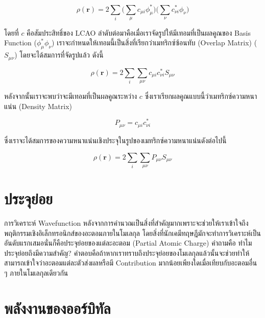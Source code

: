 \begin{equation}
    \rho (\mathbf{r}) = 2 \sum_{i} \big( \sum_{\mu} c_{\mu i} \phi_{\mu}^{*} \big) 
    \big( \sum_{\nu} c^{*}_{\nu i}  \phi_{\nu} \big)
\end{equation}

\noindent โดยที่ $c$ คือสัมประสิทธิ์ของ LCAO ลำดับต่อมาคือเมื่อเราจัดรูปให้มีเทอมที่เป็นผลคูณของ Basis Function ($\phi_{\mu}^{*} 
\phi_{\nu}$) เราจะกำหนดให้เทอมนี้เป็นสิ่งที่เรียกว่าเมทริกซ์ซ้อนทับ (Overlap Matrix) ($S_{\mu\nu}$) โดยจะได้สมการที่จัดรูปแล้ว ดังนี้

\begin{equation}
    \rho (\mathbf{r}) = 2 \sum_{i}\sum_{\mu\nu} c_{\mu i} c^{*}_{\nu i} S_{\mu\nu}
\end{equation}

หลังจากนั้นเราจะพบว่าจะมีเทอมที่เป็นผลคูณระหว่าง $c$ ซึ่งเราเรียกผลคูณแบบนี้ว่าเมทริกซ์ความหนาแน่น (Density Matrix) 

\begin{equation}\label{eq:density_matrix}
    P_{\mu\nu} = c_{\mu i} c^{*}_{\nu i}
\end{equation}

\noindent ซึ่งเราจะได้สมการของความหนาแน่นเชิงประจุในรูปของเมทริกซ์ความหนาแน่นดังต่อไปนี้

\begin{equation}\label{eq:charge_density_matrix}
    \rho (\mathbf{r}) = 2 \sum_{i} \sum_{\mu\nu} P_{\mu\nu}S_{\mu\nu}
\end{equation}

\section{ประจุย่อย}
\label{sec:partial_charge}

การวิเคราะห์ Wavefunction หลังจากการคำนวณเป็นสิ่งที่สำคัญมากเพราะจะช่วยให้เราเข้าใจถึงพฤติกรรมเชิงอิเล็กทรอนิกส์ของอะตอมภายในโมเลกุล 
โดยสิ่งที่นักเคมีทฤษฎีมักจะทำการวิเคราะห์เป็นอันดับแรกเสมอนั่นก็คือประจุย่อยของแต่ละอะตอม (Partial Atomic Charge) คำถามคือ 
ทำไมประจุย่อยถึงมีความสำคัญ? คำตอบคือถ้าหากเราทราบถึงประจุย่อยของโมเลกุลแล้วนั้นจะช่วยทำให้สามารถเข้าใจว่าอะตอมแต่ละตัวส่งผลหรือมี 
Contribution มากน้อยเพียงใดเมื่อเทียบกับอะตอมอื่น ๆ ภายในโมเลกุลเดียวกัน

\section{พลังงานของออร์บิทัล}
\label{sec:ener_orb}

